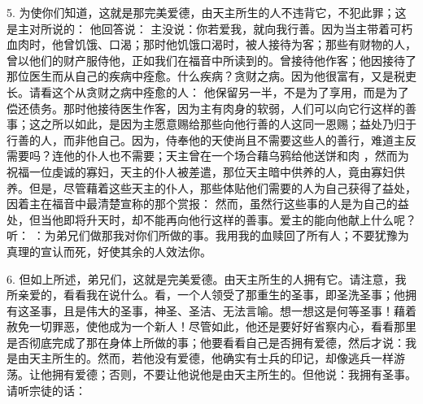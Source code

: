 5. 为使你们知道，这就是那完美爱德，由天主所生的人不违背它，不犯此罪；这是主对所说的： 他回答说： 主没说：你若爱我，就向我行善。因为当主带着可朽血肉时，他曾饥饿、口渴；那时他饥饿口渴时，被人接待为客；那些有财物的人，曾以他们的财产服侍他，正如我们在福音中所读到的。曾接待他作客；他因接待了那位医生而从自己的疾病中痊愈。什么疾病？贪财之病。因为他很富有，又是税吏长。请看这个从贪财之病中痊愈的人：  他保留另一半，不是为了享用，而是为了偿还债务。那时他接待医生作客，因为主有肉身的软弱，人们可以向它行这样的善事；这之所以如此，是因为主愿意赐给那些向他行善的人这同一恩赐；益处乃归于行善的人，而非他自己。因为，侍奉他的天使尚且不需要这些人的善行，难道主反需要吗？连他的仆人也不需要；天主曾在一个场合藉乌鸦给他送饼和肉 ，然而为祝福一位虔诚的寡妇，天主的仆人被差遣，那位天主暗中供养的人，竟由寡妇供养。但是，尽管藉着这些天主的仆人，那些体贴他们需要的人为自己获得了益处，因着主在福音中最清楚宣称的那个赏报：  然而，虽然行这些事的人是为自己的益处，但当他即将升天时，却不能再向他行这样的善事。爱主的能向他献上什么呢？听： ：为弟兄们做那我对你们所做的事。我用我的血赎回了所有人；不要犹豫为真理的宣认而死，好使其余的人效法你。\par

6. 但如上所述，弟兄们，这就是完美爱德。由天主所生的人拥有它。请注意，我所亲爱的，看看我在说什么。看，一个人领受了那重生的圣事，即圣洗圣事；他拥有这圣事，且是伟大的圣事，神圣、圣洁、无法言喻。想一想这是何等圣事！藉着赦免一切罪恶，使他成为一个新人！尽管如此，他还是要好好省察内心，看看那里是否彻底完成了那在身体上所做的事；他要看看自己是否拥有爱德，然后才说：我是由天主所生的。然而，若他没有爱德，他确实有士兵的印记，却像逃兵一样游荡。让他拥有爱德；否则，不要让他说他是由天主所生的。但他说：我拥有圣事。请听宗徒的话： \par

